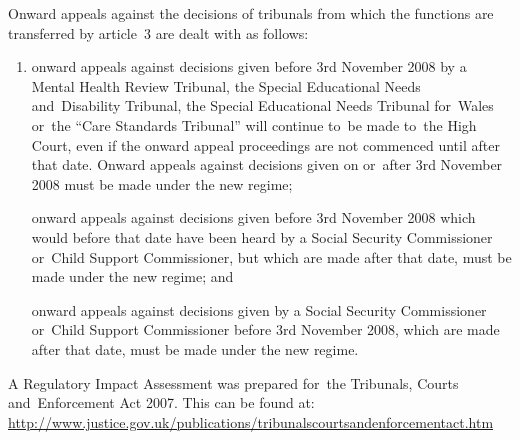 \documentclass[12pt,a4paper]{article}
\begin{document}
Onward appeals against the decisions of tribunals from which the functions are transferred by article~3 are dealt with as follows:
\begin{enumerate}\item[]
    onward appeals against decisions given before 3rd November 2008 by a Mental Health Review Tribunal, the Special Educational Needs and~Disability Tribunal, the Special Educational Needs Tribunal for~Wales or~the “Care Standards Tribunal” will continue to~be made to~the High Court, even if the onward appeal proceedings are not commenced until after that date. Onward appeals against decisions given on or~after 3rd November 2008 must be made under the new regime;

    onward appeals against decisions given before 3rd November 2008 which would before that date have been heard by a Social Security Commissioner or~Child Support Commissioner, but which are made after that date, must be made under the new regime; and

    onward appeals against decisions given by a Social Security Commissioner or~Child Support Commissioner before 3rd November 2008, which are made after that date, must be made under the new regime. 
\end{enumerate}

A Regulatory Impact Assessment was prepared for~the Tribunals, Courts and~Enforcement Act 2007. This can be found at:
\url{http://www.justice.gov.uk/publications/tribunalscourtsandenforcementact.htm}
\end{document}
